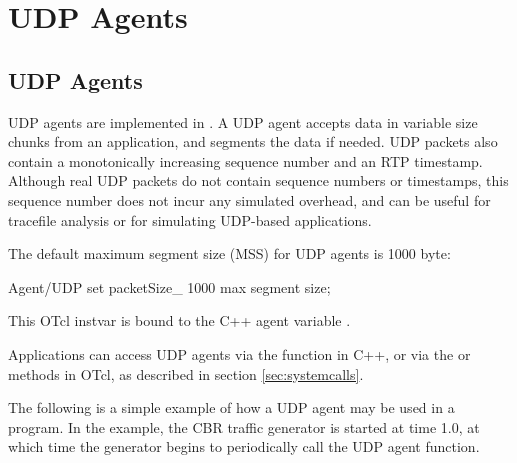 \chapter{UDP Agents}
\label{sec:udpAgents}

\section{UDP Agents}
UDP agents are implemented in .  A UDP agent accepts
data in variable size chunks from an application, and segments the data 
if needed.  UDP packets also contain a monotonically increasing sequence
number and an RTP timestamp.  Although real UDP packets do not contain 
sequence numbers or timestamps, this sequence number does not incur any 
simulated overhead, and can be useful for tracefile analysis or for
simulating UDP-based applications.

The default maximum segment size (MSS) for UDP agents is 1000 byte:
\begin{program}
Agent/UDP set packetSize_   1000              \; max segment size;
\end{program}
This OTcl instvar is bound to the C++ agent variable .  

Applications can access UDP agents via the  function in C++,
or via the  or  methods in OTcl, as described in
section \ref{sec:systemcalls}.  

The following is a simple example of how a UDP agent may be used in a program.  
In the example, the CBR traffic generator is started at time 1.0, at which time
the generator begins to periodically call the UDP agent 
function.
\endinput
